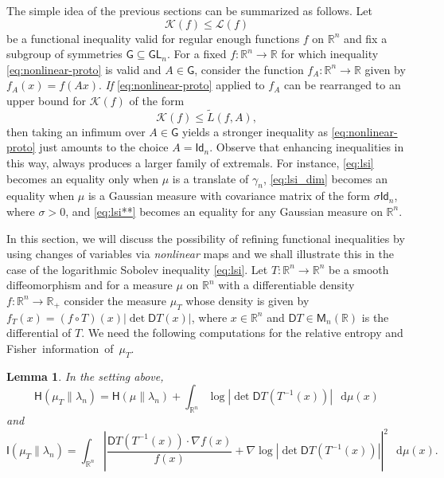 \documentclass[a4paper,twoside,11pt,reqno]{amsart}
\newtheorem{lemma}[theorem]{Lemma}
\newcommand*\diff{\mathop{}\!\mathrm{d}}
\newcommand{\R}{\mathbb{R}} %
\newcommand{\ms}{\mathscr}
\newcommand{\msf}{\mathsf}
\newcommand{\II}{\mathsf{I}}
\newcommand{\HH}{\mathsf{H}}
\newcommand{\DD}{\mathsf{D}}
\begin{document}
The simple idea of the previous sections can be summarized as follows.  Let 
\begin{equation} \label{eq:nonlinear-proto}
\ms{K}(f)\leq \ms{L}(f)
\end{equation} 
be a functional inequality valid for regular enough functions $f$ on $\R^n$ and fix a subgroup of symmetries $\msf{G}\subseteq\msf{GL}_n$. For a fixed $f:\R^n\to\R$ for which inequality \eqref{eq:nonlinear-proto} is valid and $A\in\msf{G}$, consider the function $f_A:\R^n\to\R$ given by $f_A(x) = f(Ax)$. \emph{If} \eqref{eq:nonlinear-proto} applied to $f_A$ can be rearranged to an upper bound for $\ms{K}(f)$ of the form
\begin{equation}
\ms{K}(f) \leq \widetilde{L}(f,A),
\end{equation}
then taking an infimum over $A\in\msf{G}$ yields a stronger inequality as \eqref{eq:nonlinear-proto} just amounts to the choice $A=\msf{Id}_n$. Observe that enhancing inequalities in this way, always produces a larger family of extremals. For instance, \eqref{eq:lsi} becomes an equality only when $\mu$ is a translate of $\gamma_n$, \eqref{eq:lsi_dim} becomes an equality when $\mu$ is a Gaussian measure with covariance matrix of the form $\sigma\msf{Id}_n$, where $\sigma>0$, and \eqref{eq:lsi**} becomes an equality for any Gaussian measure on $\R^n$.

In this section, we will discuss the possibility of refining functional inequalities by using changes of variables via \emph{nonlinear} maps and we shall illustrate this in the case of the logarithmic Sobolev inequality \eqref{eq:lsi}. Let $T:\R^n\to\R^n$ be a smooth diffeomorphism and for a measure $\mu$ on $\R^n$ with a differentiable density $f:\R^n\to\R_+$ consider the measure $\mu_T$ whose density is given by $f_T(x) = (f\circ T)(x) |\det \DD T(x)|$, where $x\in\R^n$ and $\DD T\in\msf{M}_n(\R)$ is the differential of $T$. We  need the following computations for the relative entropy and \mbox{Fisher information of $\mu_T$.}

\begin{lemma} \label{lem:mT}
In the setting above,
\begin{equation} \label{eq:HmT}
\HH(\mu_T\|\lambda_n) = \HH(\mu\|\lambda_n) + \int_{\R^n} \log|\det \DD T(T^{-1}(x))| \,\diff\mu(x)
\end{equation}
and
\begin{equation} \label{eq:ImT}
\II(\mu_T\|\lambda_n) = \int_{\R^n} \left| \frac{\msf{D}T(T^{-1}(x)) \cdot \nabla f(x)}{f(x)} +\nabla \log|\det \msf{D}T(T^{-1}(x)) |\right|^2 \,\diff\mu(x).
\end{equation}
\end{lemma}
\end{document}
